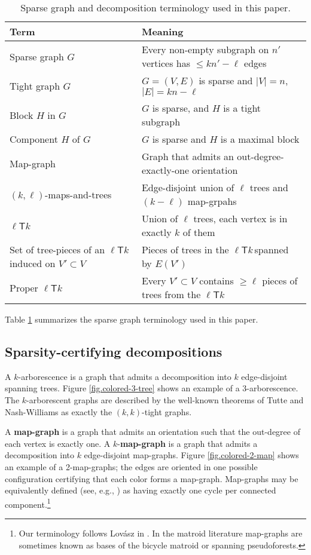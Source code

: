 \documentclass[Svgc,nospthms]{Svgc}
\newcommand{\ellteekay}{\ensuremath{\ell{\mathsf T}k}\,}
\newcommand{\reffig}[1]{Figure \ref{fig.#1}}
\newcommand{\card}[1]{\ensuremath{\left\vert #1 \right\vert}}
\begin{document}
\begin{table}
	\begin{tabular}
		{|l|l|} \hline {\bf Term} & {\bf Meaning} \\
		\hline \hline Sparse graph $G$ & Every non-empty subgraph on $n'$ vertices has $\le kn'-\ell$ edges\\
		\hline Tight graph $G$ & $G=(V,E)$ is sparse and $\card{V}=n$, $\card{E}=kn-\ell$ \\
		\hline Block $H$ in $G$ & $G$ is sparse, and $H$ is a tight subgraph \\
		\hline Component $H$ of $G$ & $G$ is sparse and $H$ is a maximal block \\
		\hline Map-graph & Graph that admits an out-degree-exactly-one orientation \\
		\hline $(k,\ell)$-maps-and-trees &  Edge-disjoint union of $\ell$ trees and $(k-\ell)$ map-grpahs\\
		\hline \ellteekay & Union of $\ell$ trees, each vertex is in exactly $k$ of them \\
		\hline Set of tree-pieces of an $\ellteekay$ induced on $V'\subset V$ & Pieces of trees in the
		\ellteekay spanned by $E(V')$  \\
		\hline Proper \ellteekay & Every $V'\subset V$ contains $\ge\ell$ 
			pieces of trees from the \ellteekay \\
		\hline 
	\end{tabular}
	\caption{Sparse graph and decomposition terminology used in this paper.}	
	 \label{tab.sparse-terminology} 
\end{table}


Table \ref{tab.sparse-terminology} summarizes the sparse graph terminology used in this paper.

	
\subsection{Sparsity-certifying decompositions}
	A $k$-arborescence is a graph that admits a decomposition into $k$ edge-disjoint spanning trees. \reffig{colored-3-tree} shows an example of a 
	$3$-arborescence.  The $k$-arborescent graphs are described by the well-known theorems of Tutte \cite{tutte:decomposing-graph-in-factors-1961} and Nash-Williams \cite{nash-williams:decomposition-into-forests:1964} as exactly the $(k,k)$-tight graphs. 

	A {\bf map-graph} is a graph that admits an orientation such that the out-degree of each vertex is exactly one. A $k$-{\bf map-graph} is a graph that admits a decomposition into $k$ edge-disjoint map-graphs.  \reffig{colored-2-map} shows an example of a 2-map-graphs; the edges
	are oriented in one possible configuration certifying that each color forms a map-graph.
	 Map-graphs may be equivalently defined (see, e.g., \cite{oxley:matroid}) as having exactly one cycle per connected component.\footnote{Our terminology follows Lov{\'{a}}sz in \cite{lovasz:combinatorial-problems}. In the matroid literature map-graphs are sometimes known as bases of the bicycle matroid or spanning pseudoforests.}
	
\end{document}
